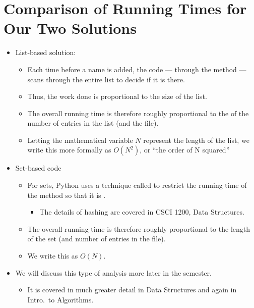 \documentclass[letterpaper,10pt,english]{sphinxmanual}
\begin{document}
\section{Comparison of Running Times for Our Two Solutions}
\label{\detokenize{lecture_notes/lec15_sets:comparison-of-running-times-for-our-two-solutions}}\begin{itemize}
\item {} 
List-based solution:
\begin{itemize}
\item {} 
Each time before a name is added, the code — through the method
 — scans through the entire list to decide if it is there.

\item {} 
Thus, the work done is proportional to the size of the list.

\item {} 
The overall running time is therefore roughly proportional to the
 of the number of entries in the list (and the file).

\item {} 
Letting the mathematical variable \(N\) represent the length
of the list, we write this more formally as \(O(N^2)\), or
“the order of N squared”

\end{itemize}

\item {} 
Set-based code
\begin{itemize}
\item {} 
For sets, Python uses a technique called  to restrict the
running time of the  method so that it is .
\begin{itemize}
\item {} 
The details of hashing are covered in CSCI 1200, Data
Structures.

\end{itemize}

\item {} 
The overall running time is therefore roughly proportional to the
length of the set (and number of entries in the file).

\item {} 
We write this as \(O(N)\).

\end{itemize}

\item {} 
We will discuss this type of analysis more later in the semester.
\begin{itemize}
\item {} 
It is covered in much greater detail in Data Structures and again
in Intro. to Algorithms.

\end{itemize}

\end{itemize}
\end{document}
